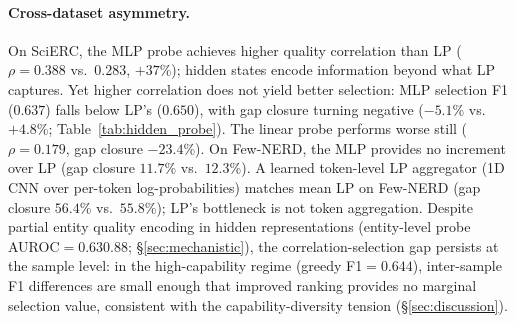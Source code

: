 \begin{table}[t]
\centering
\small
\caption{Hidden state probes vs.\ LP for sample selection (5-fold CV ${\times}$ 3 seeds). $\rho$: Spearman correlation with per-sample F1. Sel.\ F1: selection F1. Gap\%: oracle gap closure. SciERC greedy${=}0.644$ (seed 42), oracle${=}0.775$ (seed 42).}
\label{tab:hidden_probe}
\end{table}

\paragraph{Cross-dataset asymmetry.}
On SciERC, the MLP probe achieves higher quality correlation than LP ($\rho{=}0.388$ vs.\ $0.283$, $+37$\%); hidden states encode information beyond what LP captures.
Yet higher correlation does not yield better selection: MLP selection F1 ($0.637$) falls below LP's ($0.650$), with gap closure turning negative ($-5.1$\% vs.\ $+4.8$\%; Table~\ref{tab:hidden_probe}).
The linear probe performs worse still ($\rho{=}0.179$, gap closure $-23.4$\%).
On Few-NERD, the MLP provides no increment over LP (gap closure $11.7$\% vs.\ $12.3$\%).
A learned token-level LP aggregator (1D CNN over per-token log-probabilities) matches mean LP on Few-NERD (gap closure $56.4$\% vs.\ $55.8$\%); LP's bottleneck is not token aggregation.
Despite partial entity quality encoding in hidden representations (entity-level probe AUROC${=}0.63$\textendash$0.88$; \S\ref{sec:mechanistic}), the correlation-selection gap persists at the sample level: in the high-capability regime (greedy F1${=}0.644$), inter-sample F1 differences are small enough that improved ranking provides no marginal selection value, consistent with the capability-diversity tension (\S\ref{sec:discussion}).

